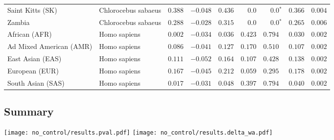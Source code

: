 \begin{center}
\begin{adjustbox}{width = 1\textwidth}
\begin{tabular}{|l|l|r|r|r|r|r|r|r|}
            Saint Kitts (SK)                  & Chlorocebus sabaeus        & $ 0.388$ & $-0.048$   & $ 0.436$ & $0.0$ & $\bm{0.0{^*}}$     & $ 0.366$ & $ 0.004$ \\
            Zambia        & Chlorocebus sabaeus        & $ 0.288$ & $-0.028$   & $ 0.315$ & $0.0$ & $\bm{0.0{^*}}$ & $ 0.265$ & $ 0.006$ \\
            African (AFR)               & Homo sapiens        & $ 0.002$ & $-0.034$   & $ 0.036$ & $ 0.423$ & $ 0.794~~$     & $ 0.030$ & $ 0.002$ \\
            Ad Mixed American (AMR)                 & Homo sapiens        & $ 0.086$ & $-0.041$   & $ 0.127$ & $ 0.170$ & $ 0.510~~$     & $ 0.107$ & $ 0.002$ \\
            East Asian (EAS)              & Homo sapiens        & $ 0.111$ & $-0.052$   & $ 0.164$ & $ 0.107$ & $ 0.428~~$     & $ 0.138$ & $ 0.002$ \\
            European (EUR)              & Homo sapiens        & $ 0.167$ & $-0.045$   & $ 0.212$ & $ 0.059$ & $ 0.295~~$     & $ 0.178$ & $ 0.002$ \\
            South Asian (SAS)              & Homo sapiens        & $ 0.017$ & $-0.031$   & $ 0.048$ & $ 0.397$ & $ 0.794~~$     & $ 0.040$ & $ 0.002$ \\
            \bottomrule
        \end{tabular}
    \end{adjustbox}
    \newpage
\end{center}

\subsection{Summary}
\begin{center}
    \texttt{[image: no\_control/results.pval.pdf]}
    \texttt{[image: no\_control/results.delta\_wa.pdf]}
\end{center}
